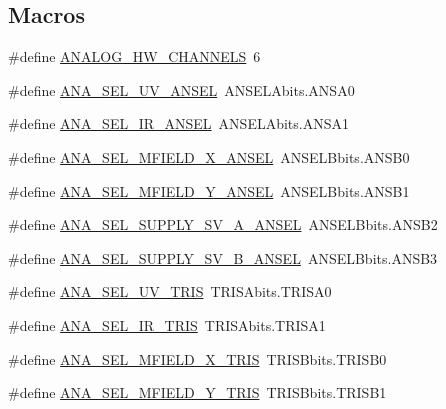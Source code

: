 \subsection*{Macros}
\begin{DoxyCompactItemize}
\item 
\#define \hyperlink{a00034_ab6ea71f43c4869429695d697be882efe}{A\+N\+A\+L\+O\+G\+\_\+\+H\+W\+\_\+\+C\+H\+A\+N\+N\+E\+L\+S}~6
\item 
\#define \hyperlink{a00034_acf69d047dc26f4c529899f0e43ff4df9}{A\+N\+A\+\_\+\+S\+E\+L\+\_\+\+U\+V\+\_\+\+A\+N\+S\+E\+L}~A\+N\+S\+E\+L\+Abits.\+A\+N\+S\+A0
\item 
\#define \hyperlink{a00034_af692a6826edc2455e2437b7c9860270b}{A\+N\+A\+\_\+\+S\+E\+L\+\_\+\+I\+R\+\_\+\+A\+N\+S\+E\+L}~A\+N\+S\+E\+L\+Abits.\+A\+N\+S\+A1
\item 
\#define \hyperlink{a00034_a5c4bafbc140f9232d3410e8461240327}{A\+N\+A\+\_\+\+S\+E\+L\+\_\+\+M\+F\+I\+E\+L\+D\+\_\+\+X\+\_\+\+A\+N\+S\+E\+L}~A\+N\+S\+E\+L\+Bbits.\+A\+N\+S\+B0
\item 
\#define \hyperlink{a00034_a121ba9dc3a320a0abecef5ba9c8b0946}{A\+N\+A\+\_\+\+S\+E\+L\+\_\+\+M\+F\+I\+E\+L\+D\+\_\+\+Y\+\_\+\+A\+N\+S\+E\+L}~A\+N\+S\+E\+L\+Bbits.\+A\+N\+S\+B1
\item 
\#define \hyperlink{a00034_afe1ebe309c61fddca0d0e3e2d16d965e}{A\+N\+A\+\_\+\+S\+E\+L\+\_\+\+S\+U\+P\+P\+L\+Y\+\_\+\+S\+V\+\_\+\+A\+\_\+\+A\+N\+S\+E\+L}~A\+N\+S\+E\+L\+Bbits.\+A\+N\+S\+B2
\item 
\#define \hyperlink{a00034_abc756eb047363bce2c87f28467784805}{A\+N\+A\+\_\+\+S\+E\+L\+\_\+\+S\+U\+P\+P\+L\+Y\+\_\+\+S\+V\+\_\+\+B\+\_\+\+A\+N\+S\+E\+L}~A\+N\+S\+E\+L\+Bbits.\+A\+N\+S\+B3
\item 
\#define \hyperlink{a00034_a634c84dd187d911747ee8954af47ef14}{A\+N\+A\+\_\+\+S\+E\+L\+\_\+\+U\+V\+\_\+\+T\+R\+I\+S}~T\+R\+I\+S\+Abits.\+T\+R\+I\+S\+A0
\item 
\#define \hyperlink{a00034_a8733fa32cccaaec0f4571e64047a1f02}{A\+N\+A\+\_\+\+S\+E\+L\+\_\+\+I\+R\+\_\+\+T\+R\+I\+S}~T\+R\+I\+S\+Abits.\+T\+R\+I\+S\+A1
\item 
\#define \hyperlink{a00034_ae2976ad54757795baf5cd70756d2032e}{A\+N\+A\+\_\+\+S\+E\+L\+\_\+\+M\+F\+I\+E\+L\+D\+\_\+\+X\+\_\+\+T\+R\+I\+S}~T\+R\+I\+S\+Bbits.\+T\+R\+I\+S\+B0
\item 
\#define \hyperlink{a00034_ac6b2c51a5f915fd4589cd2b15156d444}{A\+N\+A\+\_\+\+S\+E\+L\+\_\+\+M\+F\+I\+E\+L\+D\+\_\+\+Y\+\_\+\+T\+R\+I\+S}~T\+R\+I\+S\+Bbits.\+T\+R\+I\+S\+B1
\item 

\end{DoxyCompactItemize}
